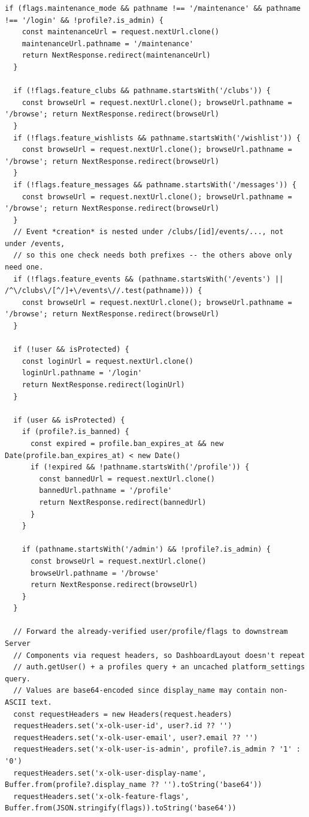 \begin{lstlisting}[caption={\pathname{src/proxy.ts} — full file}]
  if (flags.maintenance_mode && pathname !== '/maintenance' && pathname !== '/login' && !profile?.is_admin) {
    const maintenanceUrl = request.nextUrl.clone()
    maintenanceUrl.pathname = '/maintenance'
    return NextResponse.redirect(maintenanceUrl)
  }

  if (!flags.feature_clubs && pathname.startsWith('/clubs')) {
    const browseUrl = request.nextUrl.clone(); browseUrl.pathname = '/browse'; return NextResponse.redirect(browseUrl)
  }
  if (!flags.feature_wishlists && pathname.startsWith('/wishlist')) {
    const browseUrl = request.nextUrl.clone(); browseUrl.pathname = '/browse'; return NextResponse.redirect(browseUrl)
  }
  if (!flags.feature_messages && pathname.startsWith('/messages')) {
    const browseUrl = request.nextUrl.clone(); browseUrl.pathname = '/browse'; return NextResponse.redirect(browseUrl)
  }
  // Event *creation* is nested under /clubs/[id]/events/..., not under /events,
  // so this one check needs both prefixes -- the others above only need one.
  if (!flags.feature_events && (pathname.startsWith('/events') || /^\/clubs\/[^/]+\/events\//.test(pathname))) {
    const browseUrl = request.nextUrl.clone(); browseUrl.pathname = '/browse'; return NextResponse.redirect(browseUrl)
  }

  if (!user && isProtected) {
    const loginUrl = request.nextUrl.clone()
    loginUrl.pathname = '/login'
    return NextResponse.redirect(loginUrl)
  }

  if (user && isProtected) {
    if (profile?.is_banned) {
      const expired = profile.ban_expires_at && new Date(profile.ban_expires_at) < new Date()
      if (!expired && !pathname.startsWith('/profile')) {
        const bannedUrl = request.nextUrl.clone()
        bannedUrl.pathname = '/profile'
        return NextResponse.redirect(bannedUrl)
      }
    }

    if (pathname.startsWith('/admin') && !profile?.is_admin) {
      const browseUrl = request.nextUrl.clone()
      browseUrl.pathname = '/browse'
      return NextResponse.redirect(browseUrl)
    }
  }

  // Forward the already-verified user/profile/flags to downstream Server
  // Components via request headers, so DashboardLayout doesn't repeat
  // auth.getUser() + a profiles query + an uncached platform_settings query.
  // Values are base64-encoded since display_name may contain non-ASCII text.
  const requestHeaders = new Headers(request.headers)
  requestHeaders.set('x-olk-user-id', user?.id ?? '')
  requestHeaders.set('x-olk-user-email', user?.email ?? '')
  requestHeaders.set('x-olk-user-is-admin', profile?.is_admin ? '1' : '0')
  requestHeaders.set('x-olk-user-display-name', Buffer.from(profile?.display_name ?? '').toString('base64'))
  requestHeaders.set('x-olk-feature-flags', Buffer.from(JSON.stringify(flags)).toString('base64'))


\end{lstlisting}
